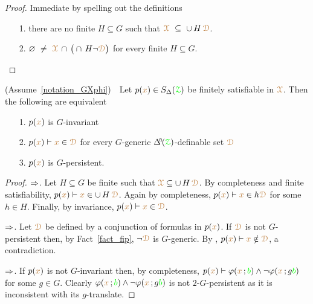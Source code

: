 \begin{proof}
  Immediate by spelling out the definitions
  \begin{itemize}
    \item[1.] there are no finite $H\subseteq G$ such that ${\color{brown}\EuScript X}\ \subseteq\ \cup\, H\,{\color{brown}\EuScript D}$.
    \item[2.]  $\0\ \neq\ \mrX\,\cap\,\big(\cap\, H\neg{\mr\D}\big)$ for every finite $H\subseteq G$.\qedhere
  \end{itemize} 
\end{proof}

\begin{theorem}\label{thm_generic_invariant}
  (Assume~\ref{notation_GXphi})\ \  
  Let $p({\color{brown} x})\in S_\Delta({\color{green}\EuScript Z})$ be finitely satisfiable in ${\color{brown}\EuScript X}$.
  Then the following are equivalent
  \begin{itemize}
    \item[1.] $p({\color{brown} x})$ is $G$-invariant
    \item[2.] $p({\color{brown} x})\vdash{\color{brown}x}\in{\color{brown}\EuScript D}$ for every $G$-generic $\BDelta({\grZ})$-definable set ${\color{brown}\EuScript D}$
    \item[3.] $p({\color{brown} x})$ is $G$-persistent.
  \end{itemize}
\end{theorem}

\begin{proof}
  $\Rightarrow$.
  Let $H\subseteq G$ be finite such that ${\color{brown}\EuScript X}\subseteq\cup\,H\,{\color{brown}\EuScript D}$.
  By completeness and finite satisfiability, $p({\color{brown} x})\vdash {\color{brown}x}\in\cup\,H\,{\color{brown}\EuScript D}$.
  Again by completeness, $p({\color{brown} x})\vdash {\color{brown}x}\in h{\color{brown}\EuScript D}$ for some $h\in H$.
  Finally, by invariance,  $p({\color{brown} x})\vdash{\color{brown}x}\in{\color{brown}\EuScript D}$.
  
  $\Rightarrow$.
  Let ${\color{brown}\EuScript D}$ be defined by a conjunction of formulas in $p({\color{brown} x})$.
  If ${\color{brown}\EuScript D}$ is not $G$-persistent then, by Fact~\ref{fact_fip}, $\neg{\color{brown}\EuScript D}$ is $G$-generic. 
  By \ssf2, $p({\color{brown} x})\vdash{\color{brown}x}\notin{\color{brown}\EuScript D}$, a contradiction.

  $\Rightarrow$.
  If $p({\color{brown} x})$ is not $G$-invariant then, by completeness, $p({\color{brown} x})\vdash\varphi({\color{brown} x}\,;{\color{green} b})\wedge\neg\varphi({\color{brown} x}\,;g{\color{green} b})$ for some $g\in G$.
  Clearly $\varphi({\color{brown} x}\,;{\color{green} b})\wedge\neg\varphi({\color{brown} x}\,;g{\color{green} b})$ is not $2$-$G$-persistent as it is inconsistent with its $g$-translate.
\end{proof}

